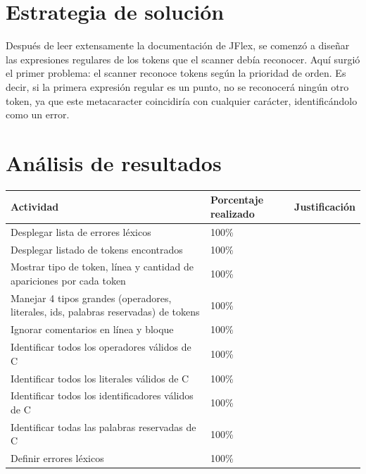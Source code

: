 \documentclass[a4paper,12pt]{article}
\begin{document}
\section*{Estrategia de solución}
\begin{flushleft}
    \hspace*{2em} Después de leer extensamente la documentación 
    de JFlex, se comenzó a diseñar las expresiones regulares 
    de los tokens que el scanner debía reconocer. Aquí surgió 
    el primer problema: el scanner reconoce tokens según la 
    prioridad de orden. Es decir, si la primera expresión 
    regular es un punto, no se reconocerá ningún otro token, 
    ya que este metacaracter coincidiría con cualquier 
    carácter, identificándolo como un error.
\end{flushleft}

\newpage

\section*{Análisis de resultados}
\begin{table}[!ht]
    \centering
    \begin{tabularx}{\textwidth}{|X|X|X|}
        \hline
        Actividad & Porcentaje realizado & Justificación \\ 
        \hline
        Desplegar lista de errores léxicos & 100\% & \\
        \hline
        Desplegar listado de tokens encontrados & 100\% & \\
        \hline
        Mostrar tipo de token, línea y cantidad de apariciones por cada token & 100\% & \\
        \hline
        Manejar 4 tipos grandes (operadores, literales, ids, palabras reservadas) de tokens & 100\% & \\
        \hline
        Ignorar comentarios en línea y bloque & 100\% & \\
        \hline
        Identificar todos los operadores válidos de C & 100\% & \\
        \hline
        Identificar todos los literales válidos de C & 100\% & \\
        \hline
        Identificar todos los identificadores válidos de C & 100\% & \\
        \hline
        Identificar todas las palabras reservadas de C & 100\% & \\
        \hline
        Definir errores léxicos & 100\% & \\
        \hline
    \end{tabularx}
\end{table}
\end{document}
